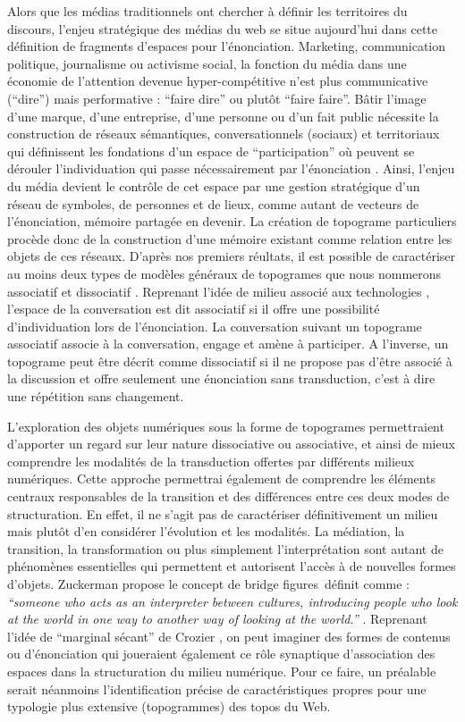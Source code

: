 Alors que les médias traditionnels ont chercher à définir les territoires du discours, l’enjeu stratégique des médias du web se situe aujourd’hui dans cette définition de fragments d’espaces pour l’énonciation. Marketing, communication politique, journalisme ou activisme social, la fonction du média dans une économie de l’attention devenue hyper-compétitive \citep{Weng2012} n’est plus communicative (“dire”) mais performative : “faire dire” ou plutôt “faire faire”. Bâtir l’image d’une marque, d’une entreprise, d’une personne ou d’un fait public nécessite la construction de réseaux sémantiques, conversationnels (sociaux) et territoriaux qui définissent les fondations d’un espace de “participation” où peuvent se dérouler l’individuation qui passe nécessairement par l’énonciation \citep{Butler1993}. Ainsi, l’enjeu du média devient le contrôle de cet espace par une gestion stratégique d’un réseau de symboles, de personnes et de lieux, comme autant de vecteurs de l’énonciation, mémoire partagée en devenir. La création de topograme particuliers procède donc de la construction d’une mémoire existant comme relation entre les objets de ces réseaux. D’après nos premiers réultats, il est possible de caractériser au moins deux types de modèles généraux de topogrames que nous nommerons associatif et dissociatif \citep{Stiegler2008}. Reprenant l’idée de milieu associé aux technologies \citep{Simondon1989}, l’espace de la conversation est dit associatif si il offre une possibilité d’individuation lors de l’énonciation. La conversation suivant un topograme associatif associe à la conversation, engage et amène à participer. A l’inverse, un topograme peut être décrit comme dissociatif si il ne propose pas d’être associé à la discussion et offre seulement une énonciation sans transduction, c’est à dire une répétition sans changement.

L’exploration des objets numériques sous la forme de topogrames permettraient d’apporter un regard sur leur nature dissociative ou associative, et ainsi de mieux comprendre les modalités de la transduction offertes par différents milieux numériques. Cette approche permettrai également de comprendre les éléments centraux responsables de la transition et des différences entre ces deux modes de structuration. En effet, il ne s’agit pas de caractériser définitivement un milieu mais plutôt d’en considérer l’évolution et les modalités. La médiation, la transition, la transformation ou plus simplement l’interprétation sont autant de phénomènes essentielles qui permettent et autorisent l’accès à de nouvelles formes d’objets. Zuckerman propose le concept de bridge figures définit comme : \textit{``someone who acts as an interpreter between cultures, introducing people who look at the world in one way to another way of looking at the world.''} \citep{Zuckerman2013}. Reprenant l’idée de ``marginal sécant'' de Crozier \citep{Crozier1977}, on peut imaginer des formes de contenus ou d’énonciation qui joueraient également ce rôle synaptique d’association des espaces dans la structuration du milieu numérique. Pour ce faire, un préalable serait néanmoins l’identification précise de caractéristiques propres pour une typologie plus extensive (topogrammes) des topos du Web. 

